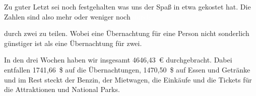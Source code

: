 Zu guter Letzt sei noch festgehalten was uns der Spaß in etwa gekostet hat.
Die Zahlen sind also mehr oder weniger noch \textcolor{white}{durch}

\thispagestyle{empty}
\newpage

\noindent
durch zwei zu teilen.
Wobei eine Übernachtung für eine Person nicht sonderlich günstiger ist als eine Übernachtung für zwei.

In den drei Wochen haben wir insgesamt 4646,43~€ durchgebracht. Dabei entfallen 1741,66~\$ auf die Übernachtungen, 1470,50~\$ auf Essen und Getränke und im Rest steckt der Benzin, der Mietwagen, die Einkäufe und die Tickets für die Attraktionen und National Parks.
